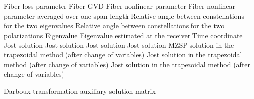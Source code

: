 \begin{enumerate}[wide=0pt, labelwidth=4em, align=left]
\symb{\loss} Fiber-loss parameter
\symb{\dispersion} Fiber \acl{GVD}
\symb{\nonlinfact} Fiber nonlinear parameter
\symb{\bar{\nonlinfact}} Fiber nonlinear parameter averaged over one span length
 Relative angle between constellations for the two eigenvalues
 Relative angle between constellations for the two polarizations
\symb{\eig} Eigenvalue
\symb{\eigest}  Eigenvalue estimated at the receiver
\symb{\ttm}  Time coordinate
\symb{\jostp}  Jost solution
\symb{\jostpconj}  Jost solution
\symb{\jostn}  Jost solution
\symb{\jostnconj}  Jost solution
\symb{\psisol(\nttm,\eig)} \acs{MZSP} solution  in the trapezoidal method (after change of variables)
\symb{\tjostp}  Jost solution in the trapezoidal method (after change of variables)
\symb{\tjostn}  Jost solution in the trapezoidal method (after change of variables)

\symb{\auxsolmat}  Darboux transformation auxiliary solution matrix


\end{enumerate}

